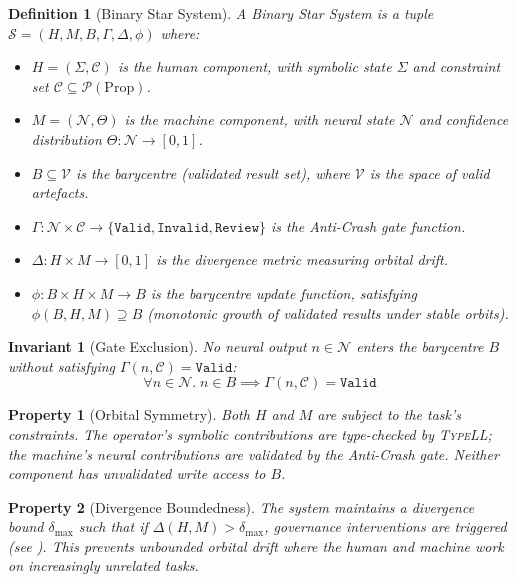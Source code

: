 \documentclass[11pt,a4paper]{article}
\newtheorem{definition}{Definition}[section]
\newtheorem{invariant}{Invariant}[section]
\newtheorem{property}{Property}[section]
\newcommand{\typell}{\textsc{TypeLL}}
\begin{document}
\begin{definition}[Binary Star System]\label{def:binary-star}
A \textit{Binary Star System} is a tuple
$\mathcal{S} = (H, M, B, \Gamma, \Delta, \phi)$ where:
\begin{itemize}
  \item $H = (\Sigma, \mathcal{C})$ is the human component,
    with symbolic state $\Sigma$ and constraint set
    $\mathcal{C} \subseteq \mathcal{P}(\text{Prop})$.
  \item $M = (\mathcal{N}, \Theta)$ is the machine component,
    with neural state $\mathcal{N}$ and confidence distribution
    $\Theta : \mathcal{N} \to [0,1]$.
  \item $B \subseteq \mathcal{V}$ is the barycentre (validated
    result set), where $\mathcal{V}$ is the space of valid artefacts.
  \item $\Gamma : \mathcal{N} \times \mathcal{C} \to
    \{\texttt{Valid}, \texttt{Invalid}, \texttt{Review}\}$ is the
    \textit{Anti-Crash gate} function.
  \item $\Delta : H \times M \to [0,1]$ is the \textit{divergence
    metric} measuring orbital drift.
  \item $\phi : B \times H \times M \to B$ is the barycentre
    update function, satisfying $\phi(B, H, M) \supseteq B$ (monotonic
    growth of validated results under stable orbits).
\end{itemize}
\end{definition}

\begin{invariant}[Gate Exclusion]\label{inv:gate}
No neural output $n \in \mathcal{N}$ enters the barycentre $B$ without
satisfying $\Gamma(n, \mathcal{C}) = \texttt{Valid}$:
\[
  \forall n \in \mathcal{N}.\; n \in B \implies
    \Gamma(n, \mathcal{C}) = \texttt{Valid}
\]
\end{invariant}

\begin{property}[Orbital Symmetry]\label{prop:symmetry}
Both $H$ and $M$ are subject to the task's constraints. The operator's
symbolic contributions are type-checked by \typell{}; the machine's
neural contributions are validated by the Anti-Crash gate.
Neither component has unvalidated write access to $B$.
\end{property}

\begin{property}[Divergence Boundedness]\label{prop:divergence}
The system maintains a divergence bound $\delta_{\max}$ such that if
$\Delta(H, M) > \delta_{\max}$, governance interventions are triggered
(see ). This prevents unbounded orbital drift
where the human and machine work on increasingly unrelated tasks.
\end{property}
\end{document}
